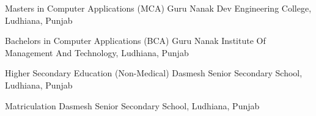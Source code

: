     {Masters in Computer Applications (MCA)}
    {}
    {}
    {}
    {Guru Nanak Dev Engineering College, Ludhiana, Punjab}



    {Bachelors in Computer Applications (BCA)}
    {}
    {}
    {}
    {Guru Nanak Institute Of Management And Technology, Ludhiana, Punjab}



    {Higher Secondary Education (Non-Medical)}
    {}
    {}
    {}
    {Dasmesh Senior Secondary School, Ludhiana, Punjab}



    {Matriculation}
    {}
    {}
    {}
    {Dasmesh Senior Secondary School, Ludhiana, Punjab}